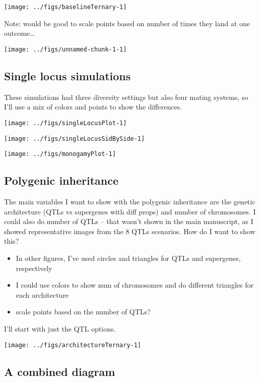 \documentclass[
]{article}
\providecommand{\tightlist}{%
  \setlength{\itemsep}{0pt}\setlength{\parskip}{0pt}}
\begin{document}
\texttt{[image: ../figs/baselineTernary-1]}

Note: would be good to scale points based on number of times they land
at one outcome\ldots{}

\texttt{[image: ../figs/unnamed-chunk-1-1]}

\hypertarget{single-locus-simulations}{%
\subsection{Single locus simulations}\label{single-locus-simulations}}

These simulations had three diversity settings but also four mating
systems, so I'll use a mix of colors and points to show the differences.

\texttt{[image: ../figs/singleLocusPlot-1]}

\texttt{[image: ../figs/singleLocusSidBySide-1]}

\texttt{[image: ../figs/monogamyPlot-1]}

\hypertarget{polygenic-inheritance}{%
\subsection{Polygenic inheritance}\label{polygenic-inheritance}}

The main variables I want to show with the polygenic inheritance are the
genetic architecture (QTLs vs supergenes with diff props) and number of
chromosomes. I could also do number of QTLs -- that wasn't shown in the
main manuscript, as I showed representative images from the 8 QTLs
scenarios. How do I want to show this?

\begin{itemize}
\tightlist
\item
  In other figures, I've used circles and triangles for QTLs and
  supergenes, respectively
\item
  I could use colors to show num of chromosomes and do different
  triangles for each architecture
\item
  scale points based on the number of QTLs?
\end{itemize}

I'll start with just the QTL options.

\texttt{[image: ../figs/architectureTernary-1]}

\hypertarget{a-combined-diagram}{%
\subsection{A combined diagram}\label{a-combined-diagram}}
\end{document}
